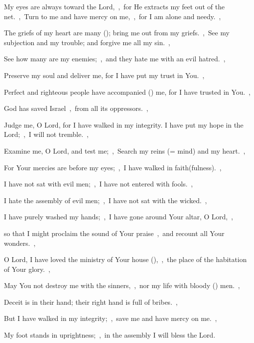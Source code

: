 \documentclass[12pt,twoside,a5paper]{article}
\begin{document}
\begin{normalparskip}
  My eyes are always toward the Lord,~\sep\ for He extracts my feet out of the net.~\sep\ Turn to me and have mercy on me,~\sep\ for I am alone and needy.~\sep

  The griefs of my heart are many (); bring me out from my griefs.~\sep\ See my subjection and my trouble; and forgive me all my sin.~\sep

  See how many are my enemies;~\sep\ and they hate me with an evil hatred.~\sep

  Preserve my soul and deliver me, for I have put my trust in You.~\sep

  Perfect and righteous people have accompanied () me, for I have trusted in You.~\sep

  God has saved Israel~\sep\ from all its oppressors.~\sep
\end{normalparskip}


\begin{normalparskip}
  Judge me, O Lord, for I have walked in my integrity. I have put my hope in the Lord;~\sep\ I will not tremble.~\sep


  Examine me, O Lord, and test me;~\sep\ Search my reins (= mind) and my heart.~\sep

  For Your mercies are before my eyes;~\sep\ I have walked in faith(fulness).~\sep

  I have not sat with evil men;~\sep\ I have not entered with fools.~\sep

  I hate the assembly of evil men;~\sep\ I have not sat with the wicked.~\sep

  I have purely washed my hands;~\sep\ I have gone around Your altar, O Lord,~\sep

  so that I might proclaim the sound of Your praise~\sep\ and recount all Your wonders.~\sep

  O Lord, I have loved the ministry of Your house (),~\sep\ the place of the habitation of Your glory.~\sep

  May You not destroy me with the sinners,~\sep\ nor my life with bloody () men.~\sep

  Deceit is in their hand; their right hand is full of bribes.~\sep

  But I have walked in my integrity;~\sep\ save me and have mercy on me.~\sep

  My foot stands in uprightness;~\sep\ in the assembly I will bless the Lord.
\end{normalparskip}
\end{document}
